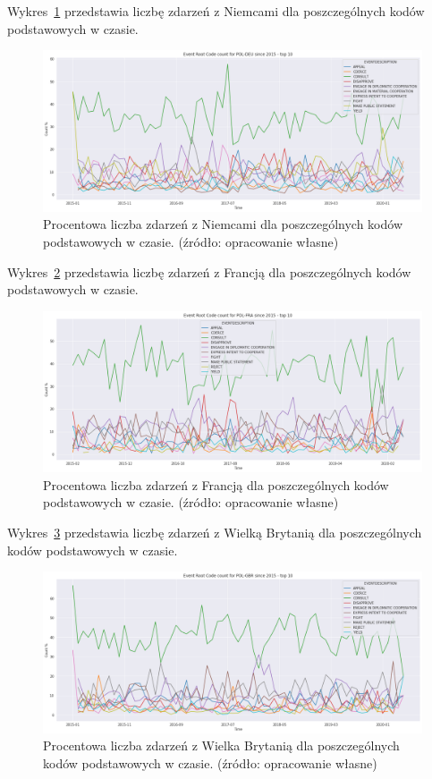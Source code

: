 \documentclass[11pt]{report}
\begin{document}
    Wykres~\ref{fig:PLDEUERC} przedstawia liczbę zdarzeń z Niemcami dla poszczególnych kodów podstawowych w czasie.
    \begin{figure}[!htp]
        \centering
        \includegraphics[width=\linewidth]{fig/PL/POLDEUERCperc.png}
        \caption{Procentowa liczba zdarzeń z Niemcami dla poszczególnych kodów podstawowych w czasie. (źródło: opracowanie własne)}
        \label{fig:PLDEUERC}
    \end{figure}

    Wykres~\ref{fig:PLFRAERC} przedstawia liczbę zdarzeń z Francją dla poszczególnych kodów podstawowych w czasie.
    \begin{figure}[!htp]
        \centering
        \includegraphics[width=\linewidth]{fig/PL/POLFRAERCperc.png}
        \caption{Procentowa liczba zdarzeń z Francją dla poszczególnych kodów podstawowych w czasie. (źródło: opracowanie własne)}
        \label{fig:PLFRAERC}
    \end{figure}

    Wykres~\ref{fig:PLGBRERC} przedstawia liczbę zdarzeń z Wielką Brytanią dla poszczególnych kodów podstawowych w czasie.
    \begin{figure}[!htp]
        \centering
        \includegraphics[width=\linewidth]{fig/PL/POLGBRERCperc.png}
        \caption{Procentowa liczba zdarzeń z Wielka Brytanią dla poszczególnych kodów podstawowych w czasie. (źródło: opracowanie własne)}
        \label{fig:PLGBRERC}
    \end{figure}
\end{document}
